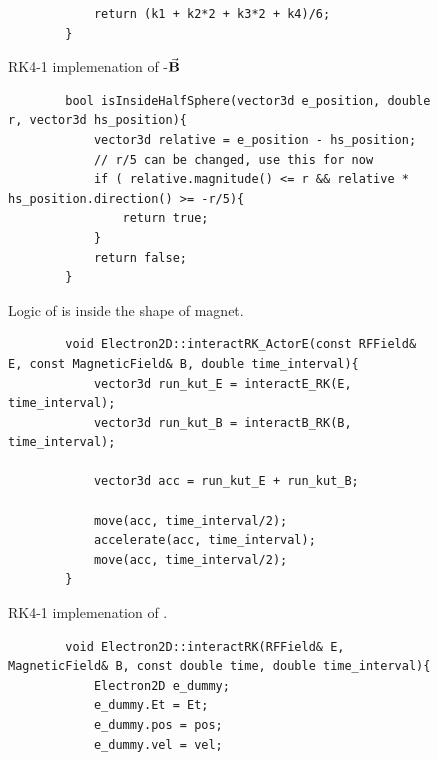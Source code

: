 \documentclass[a4paper,oneside,12pt]{report}
\numberwithin{equation}{chapter}
\begin{document}
{\begin{figure}[H]
\begin{verbatim}
            return (k1 + k2*2 + k3*2 + k4)/6;
        }
    \end{verbatim}
    \vspace{20pt}
\caption{RK4-1 implemenation of \e-$\vec{\textbf{B}}$}
\label{fig:rk1_B}
\end{figure}
\clearpage
\begin{figure}[H]
    \centering
    \begin{verbatim}
        bool isInsideHalfSphere(vector3d e_position, double r, vector3d hs_position){
            vector3d relative = e_position - hs_position;       
            // r/5 can be changed, use this for now                                
            if ( relative.magnitude() <= r && relative * hs_position.direction() >= -r/5){      
                return true;                                                                 
            }
            return false;
        }
    \end{verbatim}
    \vspace{20pt}
\caption{Logic of is \e inside the shape of magnet.}
\label{fig:is_inside_halfsphere}
\end{figure}
\vspace{20pt}
\begin{figure}[H]
    \centering
    \begin{verbatim}
        void Electron2D::interactRK_ActorE(const RFField& E, const MagneticField& B, double time_interval){
            vector3d run_kut_E = interactE_RK(E, time_interval);
            vector3d run_kut_B = interactB_RK(B, time_interval);
        
            vector3d acc = run_kut_E + run_kut_B;
            
            move(acc, time_interval/2);
            accelerate(acc, time_interval);
            move(acc, time_interval/2);
        }
    \end{verbatim}
    \vspace{20pt}
\caption{RK4-1 implemenation of \eEM.}
\label{fig:rk1_EM}
\end{figure}

\begin{figure}[H]
    \centering
    \begin{verbatim}
        void Electron2D::interactRK(RFField& E, MagneticField& B, const double time, double time_interval){
            Electron2D e_dummy;
            e_dummy.Et = Et;
            e_dummy.pos = pos;
            e_dummy.vel = vel;
    

\end{verbatim}
\end{figure}}
\end{document}
